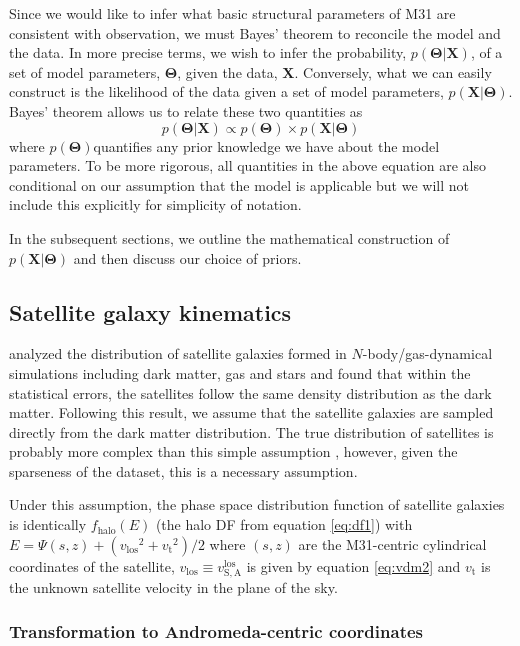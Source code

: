 \documentclass[preprint]{aastex}
\newcommand{\eq}[1]{equation \ref{eq:#1}}
\newcommand{\bvec}[1]{\ensuremath{\boldsymbol{#1}}}
\newcommand{\paramvector}[1]{\bvec{#1}}
\newcommand{\model}{\paramvector{\Theta}}
\newcommand{\data}{\paramvector{X}}
\newcommand{\prob}{\ensuremath{p}}
\newcommand{\probability}[2]{\ensuremath{\prob ( #1 | #2 )}}
\newcommand{\likelihood}{\probability{\data}{\model}}
\newcommand{\posterior}{\probability{\model}{\data}}
\newcommand{\prior}{\ensuremath{\prob (\model)}}
\newcommand{\df}{f}
\newcommand{\dfs}[1]{\df_\mathrm{#1}}
\newcommand{\dfhalo}{\dfs{halo}}
\newcommand{\E}{\ensuremath{E}}
\newcommand{\vlos}{\ensuremath{v_\mathrm{los}}}
\newcommand{\vt}{\ensuremath{v_\mathrm{t}}}
\begin{document}
Since we would like to infer what basic structural parameters of M31 are consistent
with observation, we must Bayes' theorem to reconcile the model and the data.
In more precise terms, we wish to infer the probability, \posterior, of a set
of model parameters, \model, given the data, \data.  Conversely, what we can
easily construct is the likelihood of the data given a set of model parameters,
\likelihood.  Bayes' theorem allows us to relate these two quantities as
\begin{equation}
    \posterior \propto \prior \times \likelihood
\end{equation}
where \prior quantifies any prior knowledge we have about the model parameters.
To be more rigorous, all quantities in the above equation are also conditional
on our assumption that the model is applicable but we will not include this
explicitly for simplicity of notation.

In the subsequent sections, we outline the mathematical construction of \likelihood
and then discuss our choice of priors.

\subsection{Satellite galaxy kinematics}

\citet{Sales:2007b} analyzed the distribution of satellite galaxies formed in
$N$-body/gas-dynamical simulations including dark matter, gas and stars and found
that within the statistical errors, the satellites follow the same density
distribution as the dark matter.  Following this result, we assume that the
satellite galaxies are sampled directly from the dark matter distribution.
The true distribution of satellites is probably more complex than this simple
assumption \citep[e.g.][]{Ibata:2007}, however, given the sparseness of the
dataset, this is a necessary assumption.

Under this assumption, the phase space distribution function of satellite galaxies
is identically $\dfhalo (\E)$ (the halo DF from \eq{df1}) with
$\E = \Psi (s,z) + \left ( \vlos^2 + \vt^2 \right )/2$ where
$(s,z)$ are the M31-centric cylindrical coordinates of the satellite,
$\vlos \equiv v_\mathrm{S,A}^\mathrm{los}$ is given by \eq{vdm2}
and $v_\mathrm{t}$ is the unknown satellite velocity in the plane of the sky.

\subsubsection{Transformation to Andromeda-centric coordinates}
\end{document}
